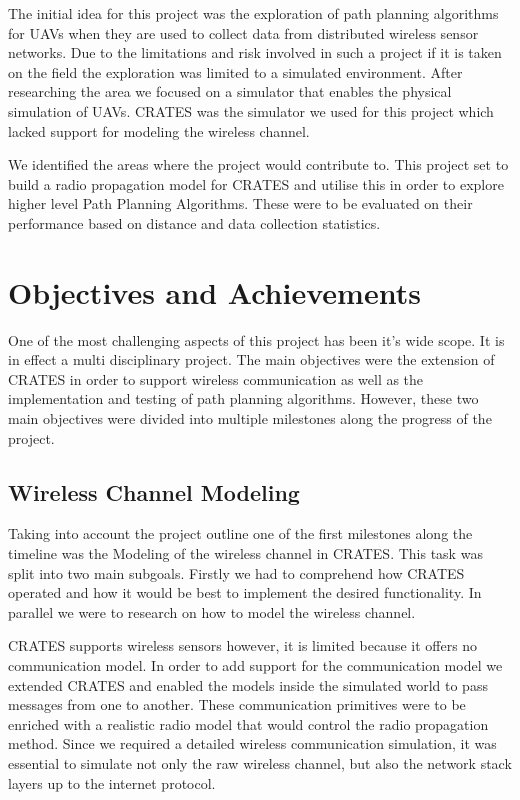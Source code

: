 The initial idea for this project was the exploration of path planning
algorithms for UAVs when they are used to collect data from distributed wireless
sensor networks. Due to the limitations and risk involved in such a project if it
is taken on the field the exploration was limited to a simulated environment.
After researching the area we focused on a simulator that enables the physical
simulation of UAVs. CRATES was the simulator we used for this project which
lacked support for modeling the wireless channel.

We identified the areas where the project would contribute to. This project set
to build a radio propagation model for CRATES and utilise this in order to
explore higher level Path Planning Algorithms. These were to be evaluated on
their performance based on distance and data collection statistics.


\section{Objectives and Achievements}
One of the most challenging aspects of this project has been it's wide scope. It
is in effect a multi disciplinary project. The main objectives were the
extension of CRATES in order to support wireless communication as well as
the implementation and testing of path planning algorithms. However, these two
main objectives were divided into multiple milestones along the progress of the
project.

\subsection{Wireless Channel Modeling}
Taking into account the project outline one of the first milestones along the
timeline was the Modeling of the wireless channel in CRATES. This task was split
into two main subgoals. Firstly we had to comprehend how CRATES operated and how
it would be best to implement the desired functionality. In parallel we were to
research on how to model the wireless channel.

CRATES supports wireless sensors however, it is limited because it offers no
communication model. In order to add support for the communication model we
extended CRATES and enabled the models inside the simulated world to pass
messages from one to another. These communication primitives were to be enriched
with a realistic radio model that would control the radio propagation method.
Since we required a detailed wireless communication simulation, it was
essential to simulate not only the raw wireless channel, but also the network
stack layers up to the internet protocol.


